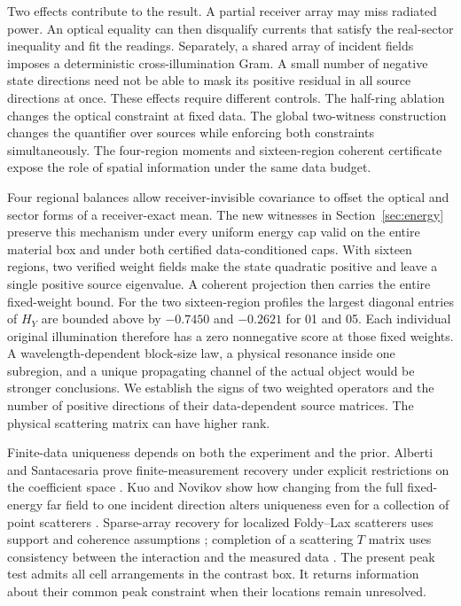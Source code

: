 \documentclass[anonymous,12pt]{iopjournal}
\theoremstyle{remark}\newtheorem{remark}[theorem]{Remark}
\numberwithin{equation}{section}
\begin{document}
Two effects contribute to the result. A partial receiver array may miss radiated power. An optical equality can then disqualify currents that satisfy the real-sector inequality and fit the readings. Separately, a shared array of incident fields imposes a deterministic cross-illumination Gram. A small number of negative state directions need not be able to mask its positive residual in all source directions at once. These effects require different controls. The half-ring ablation changes the optical constraint at fixed data. The global two-witness construction changes the quantifier over sources while enforcing both constraints simultaneously. The four-region moments and sixteen-region coherent certificate expose the role of spatial information under the same data budget.

Four regional balances allow receiver-invisible covariance to offset the optical and sector forms of a receiver-exact mean. The new witnesses in Section~\ref{sec:energy} preserve this mechanism under every uniform energy cap valid on the entire material box and under both certified data-conditioned caps. With sixteen regions, two verified weight fields make the state quadratic positive and leave a single positive source eigenvalue. A coherent projection then carries the entire fixed-weight bound. For the two sixteen-region profiles the largest diagonal entries of $H_Y$ are bounded above by $-0.7450$ and $-0.2621$ for 01 and 05. Each individual original illumination therefore has a zero nonnegative score at those fixed weights. A wavelength-dependent block-size law, a physical resonance inside one subregion, and a unique propagating channel of the actual object would be stronger conclusions. We establish the signs of two weighted operators and the number of positive directions of their data-dependent source matrices. The physical scattering matrix can have higher rank.

Finite-data uniqueness depends on both the experiment and the prior. Alberti and Santacesaria prove finite-measurement recovery under explicit restrictions on the coefficient space \cite{alberti19,alberti21}. Kuo and Novikov show how changing from the full fixed-energy far field to one incident direction alters uniqueness even for a collection of point scatterers \cite{kuo_novikov}. Sparse-array recovery for localized Foldy--Lax scatterers uses support and coherence assumptions \cite{chai}; completion of a scattering $T$ matrix uses consistency between the interaction and the measured data \cite{levinson}. The present peak test admits all cell arrangements in the contrast box. It returns information about their common peak constraint when their locations remain unresolved.
\end{document}
